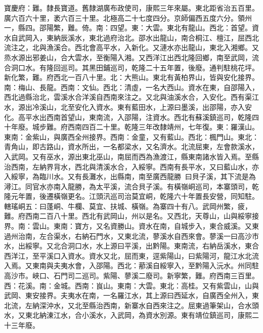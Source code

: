 \begin{pinyinscope}
寶慶府：難。隸長寶道。舊隸湖廣布政使司，康熙三年來屬。東北距省治五百里。廣六百六十里，袤六百三十里。北極高二十七度四分。京師偏西五度六分。領州一，縣四。邵陽繁，難。倚。南：四望。東：大雲。東北有龍山。西北：首望。資水自武岡入，東納辰溪水，東北過府治北。邵水出龍山，南合桐江、檀江，屈西北流注之，北與漁溪合。西北會高平水，入新化。又漣水亦出龍山，東北入湘鄉。又烝水源出邪姜山，合大雲水，至衡陽入湘。又西洋江出西北隆回鄉，南至武岡，流合洞口水。有隆回巡司。其黑田鋪巡司，乾隆二十五年置，後廢。通判駐桃花坪。新化繁，難。府西北一百八十里。北：大熊山。東北有黃柏界山，皆與安化接界。南：梅山、長龍。西南：文仙。西北：清虛，一名大西山。資水在東，自邵陽入，西北過縣治北，雲溪水合洋溪自西南來注之。又北與油溪水合，入安化。西有渠江水，源出冷溪山，北至安化入資水。東有藍田水，上源曰墨溪，出邵陽，亦入安化。高平水出西南首望山，東南流，入邵陽，注資水。西北有蘇溪鎮巡司，乾隆四十年廢。城步難。府西南四百二十里。乾隆三年改隸靖州，七年復。東：羅漢山。東南：金紫山，與廣西全州接界。西南：金童，又有藍山。西北：楓門山。東北：青角山，即古路山，資水所出，一名都梁水，又名濟水。北流屈東，左會款溪水，入武岡。又有巫水，源出東北巫山，南屈而西為漁渡江，縣東南諸水皆入焉。至縣治西南，左納界背水，西北與清溪水合，入綏寧。西南有長平水，又曰藍山水，亦入綏寧，為臨川水。又有長灘水，出縣南，南至廣西龍勝，曰貝子溪，其下流是為潯江。同官水亦南入龍勝，為太平溪，流合貝子溪。有橫嶺峒巡司，本寨頭司，乾隆元年置，後遷橫嶺更名。江頭汛巡司治莫宜峒，乾隆六十年置長安營，同知駐。轄瑤峒五：曰蓬峒、牛欄、莫宜、扶城、橫嶺。為寨四十有八。武岡州繁，疲，難。府西南二百八十里。西北有武岡山，州以是名。又西北，天尊山，山與綏寧接界。南：雲山。東南：寶方，又名資勝山。資水在南，自城步入，東合威溪。又東過州治南，左合渠水，右納石門水，又東北流，蓼溪水自西來會。蓼溪一曰高沙市水，出綏寧。又北合洞口水，水上源曰平溪，出黔陽。東南流，右納岳溪水，東合西洋江，至平溪口入資水。資水又北，屈而東，逕紫陽山，曰紫陽河，龍江水北流入焉。又東南與夫夷水會，入邵陽。西北：𦰡溪自綏寧入，至黔陽入沅水。州同駐高沙市。峽口、石門司二巡司。紫陽、蓼溪二廢司。新寧繁，難。府西南三百里。西：花溪。南：金城。西南：峎山。東南：大雲。東北：高桂。又有紫雲山，山與武岡、東安接界。夫夷水在南，一名羅江水，其上源曰西延水，自廣西全州入，東北流，左納深沖水，又北至縣治西南，新寨水自西來注之。屈東過筆架山，合水頭水，又東北納涷江水，合小溪水，入武岡，為資水別源。東有靖位鎮巡司，康熙二十三年廢。


\end{pinyinscope}
